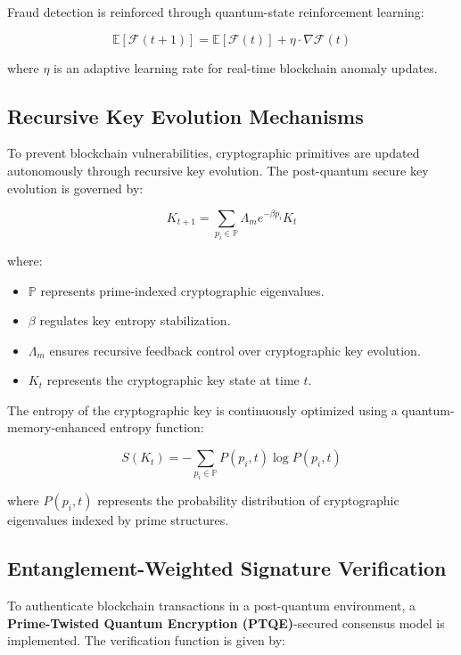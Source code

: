 \documentclass{article}
\theoremstyle{plain}
\begin{document}
Fraud detection is reinforced through quantum-state reinforcement learning:

\begin{equation}
    \mathbb{E}[\mathcal{F}(t+1)] = \mathbb{E}[\mathcal{F}(t)] + \eta \cdot \nabla \mathcal{F}(t)
\end{equation}

where $\eta$ is an adaptive learning rate for real-time blockchain anomaly updates.

\subsection{Recursive Key Evolution Mechanisms}

To prevent blockchain vulnerabilities, cryptographic primitives are updated autonomously through recursive key evolution. The post-quantum secure key evolution is governed by:

\begin{equation}
    K_{t+1} = \sum_{p_i \in \mathbb{P}} \Lambda_m e^{-\beta p_i} K_t
\end{equation}

where:
\begin{itemize}
    \item $\mathbb{P}$ represents prime-indexed cryptographic eigenvalues.
    \item $\beta$ regulates key entropy stabilization.
    \item $\Lambda_m$ ensures recursive feedback control over cryptographic key evolution.
    \item $K_t$ represents the cryptographic key state at time $t$.
\end{itemize}

The entropy of the cryptographic key is continuously optimized using a quantum-memory-enhanced entropy function:

\begin{equation}
    S(K_t) = - \sum_{p_i \in \mathbb{P}} P(p_i, t) \log P(p_i, t)
\end{equation}

where $P(p_i, t)$ represents the probability distribution of cryptographic eigenvalues indexed by prime structures.

\subsection{Entanglement-Weighted Signature Verification}

To authenticate blockchain transactions in a post-quantum environment, a \textbf{Prime-Twisted Quantum Encryption (PTQE)}-secured consensus model is implemented. The verification function is given by:
\end{document}
